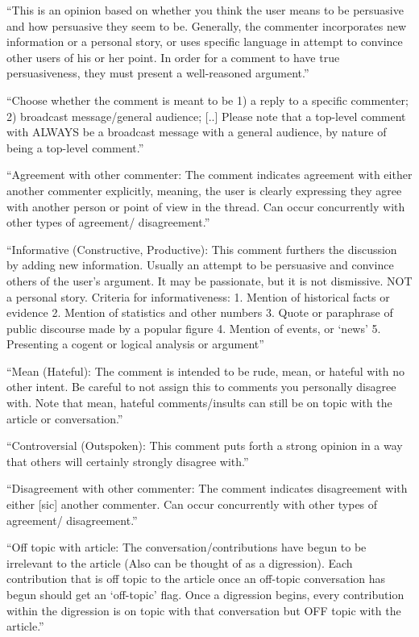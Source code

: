 \begin{description}
    \item \item [Persuasive] ``This is an opinion based on whether you think the user means to be persuasive and how persuasive they seem to be. Generally, the commenter incorporates new information or a personal story, or uses specific language in attempt to convince other users of his or her point. In order for a comment to have true persuasiveness, they must present a well-reasoned argument.''
    \item [Audience] ``Choose whether the comment is meant to be 1) a reply to a specific commenter; 2) broadcast message/general audience; [..] Please note that a top-level comment with ALWAYS be a broadcast message with a general audience, by nature of being a top-level comment.''
	\item [Agreement] ``Agreement with other commenter: The comment indicates agreement with either another commenter explicitly, meaning, the user is clearly expressing they agree with another person or point of view in the thread. Can occur concurrently with other types of agreement/ disagreement.''
	\item [Informative] ``Informative (Constructive, Productive): This comment furthers the discussion by adding new information. Usually an attempt to be persuasive and convince others of the user's argument. It may be passionate, but it is not dismissive. NOT a personal story. Criteria for informativeness: 1. Mention of historical facts or evidence 2. Mention of statistics and other numbers 3. Quote or paraphrase of public discourse made by a popular figure 4. Mention of events, or `news' 5. Presenting a cogent or logical analysis or argument''
	\item [Mean] ``Mean (Hateful): The comment is intended to be rude, mean, or hateful with no other intent. Be careful to not assign this to comments you personally disagree with. Note that mean, hateful comments/insults can still be on topic with the article or conversation.''
	\item [Controversial] ``Controversial (Outspoken): This comment puts forth a strong opinion in a way that others will certainly strongly disagree with.''
	\item [Disagreement] ``Disagreement with other commenter: The comment indicates disagreement with either [sic] another commenter. Can occur concurrently with other types of agreement/ disagreement.''
	\item [Off-topic] ``Off topic with article: The conversation/contributions have begun to be irrelevant to the article (Also can be thought of as a digression). Each contribution that is off topic to the article once an off-topic conversation has begun should get an `off-topic' flag. Once a digression begins, every contribution within the digression is on topic with that conversation but OFF topic with the article.''

\end{description}
